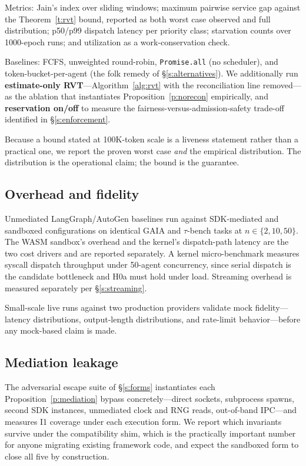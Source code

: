 \documentclass[letterpaper,11pt,leqno]{article}
\begin{document}
Metrics: Jain's index \citep{Jain84} over sliding windows; maximum pairwise service gap against the Theorem~\ref{t:rvt} bound, reported as both worst case observed and full distribution; p50/p99 dispatch latency per priority class; starvation counts over 1000-epoch runs; and utilization as a work-conservation check.

Baselines: FCFS, unweighted round-robin, \texttt{Promise.all} (no scheduler), and token-bucket-per-agent (the folk remedy of \S\ref{s:alternatives}). We additionally run \textbf{estimate-only RVT}---Algorithm~\ref{alg:rvt} with the reconciliation line removed---as the ablation that instantiates Proposition~\ref{p:norecon} empirically, and \textbf{reservation on/off} to measure the fairness-versus-admission-safety trade-off identified in \S\ref{s:enforcement}.

Because a bound stated at 100K-token scale is a liveness statement rather than a practical one, we report the proven worst case \emph{and} the empirical distribution. The distribution is the operational claim; the bound is the guarantee.

\subsection{Overhead and fidelity}\label{s:overhead}

Unmediated LangGraph/AutoGen baselines run against SDK-mediated and sandboxed configurations on identical GAIA \citep{Mialon23} and $\tau$-bench \citep{Yao24} tasks at $n \in \{2, 10, 50\}$. The WASM sandbox's overhead and the kernel's dispatch-path latency are the two cost drivers and are reported separately. A kernel micro-benchmark measures syscall dispatch throughput under 50-agent concurrency, since serial dispatch is the candidate bottleneck and H0a must hold under load. Streaming overhead is measured separately per \S\ref{s:streaming}.

Small-scale live runs against two production providers validate mock fidelity---latency distributions, output-length distributions, and rate-limit behavior---before any mock-based claim is made.

\subsection{Mediation leakage}\label{s:leakage}

The adversarial escape suite of \S\ref{s:forms} instantiates each Proposition~\ref{p:mediation} bypass concretely---direct sockets, subprocess spawns, second SDK instances, unmediated clock and RNG reads, out-of-band IPC---and measures I1 coverage under each execution form. We report which invariants survive under the compatibility shim, which is the practically important number for anyone migrating existing framework code, and expect the sandboxed form to close all five by construction.
\end{document}
